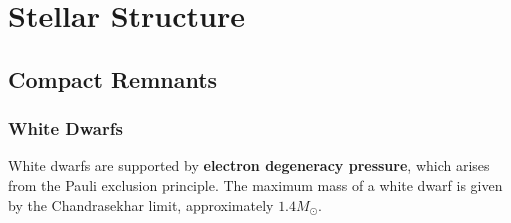 \chapter{Stellar Structure}



\section{Compact Remnants}
\subsection{White Dwarfs}
\begin{theory}
White dwarfs are supported by \textbf{electron degeneracy pressure}, which arises from the Pauli exclusion principle. The maximum mass of a white dwarf is given by the Chandrasekhar limit, approximately $1.4 M_\odot$.
\end{theory}